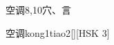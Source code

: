\begin{entry}{空调}{8,10}{⽳、⾔}
  \begin{phonetics}{空调}{kong1tiao2}[][HSK 3]
  \end{phonetics}
\end{entry}
